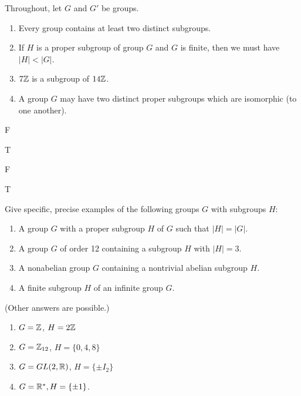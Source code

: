 \begin{exercise}[ID=4A]
\tf Throughout, let $G$ and $G'$ be  groups.

\begin{enumerate}

\item Every group contains at least two distinct subgroups.

\item If $H$ is a proper subgroup of group $G$ and $G$ is finite, then we must have $|H|<|G|$.

\item $7\mathbb{Z}$ is a subgroup of $14\mathbb{Z}$.

\item A group $G$ may have two distinct proper subgroups which are isomorphic (to one another).

\end{enumerate}
\end{exercise}

\begin{solution}[print=true]

\begin{inparaenum}[(a)]
\item F \hfill \item T \hfill \item F \hfill  \item T
\end{inparaenum}

\end{solution}


\begin{exercise}[ID=4B]
Give specific, precise examples of the following groups $G$ with subgroups $H$:
\begin{enumerate}
\item A group $G$ with a proper subgroup $H$ of $G$ such that $|H|=|G|$.
\item A group $G$ of order 12 containing a subgroup $H$ with $|H|=3$.
\item A nonabelian group $G$ containing a nontrivial abelian subgroup $H$.
\item A finite subgroup $H$ of an infinite group $G$.
\end{enumerate}

\end{exercise}

\begin{solution}[print=true]
(Other answers are possible.)


\begin{enumerate}
\item $G=\mathbb{Z}$, $H=2\mathbb{Z}$
\item $G=\mathbb{Z}_{12}$, $H=\{0,4,8\}$
\item $G=GL(2,\mathbb{R})$, $H=\{\pm I_2\}$
\item $G=\mathbb{R}^*, H=\{\pm 1\}$.
\end{enumerate}


\end{solution}

